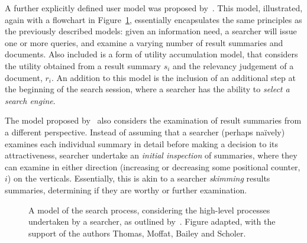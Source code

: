 A further explicitly defined user model was proposed by~\cite{thomas2014modelling_behaviour}. This model, illustrated, again with a flowchart in Figure~\ref{fig:thomas_model}, essentially encapsulates the same principles as the previously described models: given an information need, a searcher will issue one or more queries, and examine a varying number of result summaries and documents. Also included is a form of utility accumulation model, that considers the utility obtained from a result summary $s_i$ and the relevancy judgement of a document, $r_i$. An addition to this model is the inclusion of an additional step at the beginning of the search session, where a searcher has the ability to \emph{select a search engine}.

The model proposed by~\cite{thomas2014modelling_behaviour} also considers the examination of result summaries from a different perspective. Instead of assuming that a searcher (perhaps na\"{i}vely) examines each individual summary in detail before making a decision to its attractiveness, searcher undertake an \emph{initial inspection} of summaries, where they can examine in either direction (increasing or decreasing some positional counter, $i$) on the verticals. Essentially, this is akin to a searcher \emph{skimming} results summaries, determining if they are worthy or further examination.

\begin{figure}[t!]
    \centering
    \caption[Model of the search process by~\cite{thomas2014modelling_behaviour}]{A model of the search process, considering the high-level processes undertaken by a searcher, as outlined by~\cite{thomas2014modelling_behaviour}. Figure adapted, with the support of the authors Thomas, Moffat, Bailey and Scholer.}
    \label{fig:thomas_model}
\end{figure}

